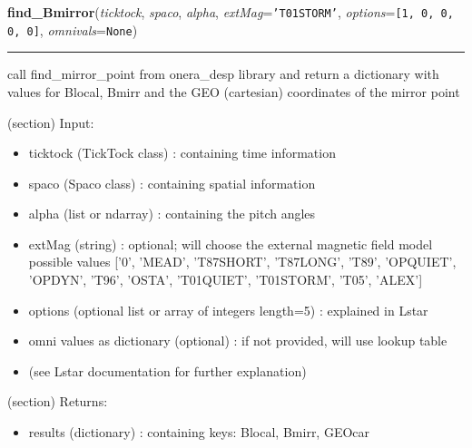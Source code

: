 \hspace{.8\funcindent}\begin{boxedminipage}{\funcwidth}

    \raggedright \textbf{find\_Bmirror}(\textit{ticktock}, \textit{spaco}, \textit{alpha}, \textit{extMag}={\tt \texttt{'}\texttt{T01STORM}\texttt{'}}, \textit{options}={\tt \texttt{[}1\texttt{, }0\texttt{, }0\texttt{, }0\texttt{, }0\texttt{]}}, \textit{omnivals}={\tt None})

    \vspace{-1.5ex}

    \rule{\textwidth}{0.5\fboxrule}
\setlength{\parskip}{2ex}
    call find\_mirror\_point from onera\_desp library and return a 
    dictionary with values for Blocal, Bmirr and the GEO (cartesian) 
    coordinates of the mirror point

    (section) Input:

      \begin{itemize}
      \setlength{\parskip}{0.6ex}
        \item ticktock (TickTock class) : containing time information

        \item spaco (Spaco class) : containing spatial information

        \item alpha (list or ndarray) : containing the pitch angles

        \item extMag (string) : optional; will choose the external magnetic 
          field model possible values ['0', 'MEAD', 'T87SHORT', 'T87LONG', 
          'T89', 'OPQUIET', 'OPDYN', 'T96', 'OSTA', 'T01QUIET', 'T01STORM',
          'T05', 'ALEX']

        \item options (optional list or array of integers length=5) : explained
          in Lstar

        \item omni values as dictionary (optional) : if not provided, will use 
          lookup table

        \item (see Lstar documentation for further explanation)

      \end{itemize}

    (section) Returns:

      \begin{itemize}
      \setlength{\parskip}{0.6ex}
        \item results (dictionary) : containing keys: Blocal, Bmirr, GEOcar


\end{itemize}
\end{boxedminipage}
